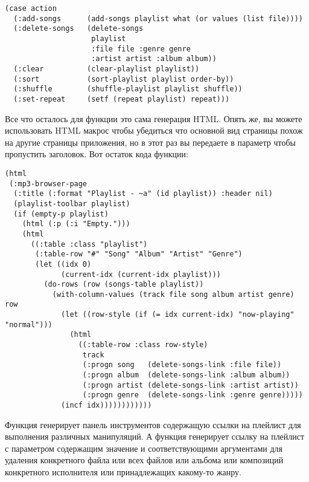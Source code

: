 \begin{lstlisting}
(case action
  (:add-songs      (add-songs playlist what (or values (list file))))
  (:delete-songs   (delete-songs 
                    playlist 
                    :file file :genre genre
                    :artist artist :album album))
  (:clear          (clear-playlist playlist))
  (:sort           (sort-playlist playlist order-by))
  (:shuffle        (shuffle-playlist playlist shuffle))
  (:set-repeat     (setf (repeat playlist) repeat)))
\end{lstlisting}

Все что осталось для функции  это сама генерация HTML. Опять же, вы можете
использовать HTML макрос  чтобы убедиться что основной вид
страницы похож на другие страницы приложения, но в этот раз вы передаете  в
параметр  чтобы пропустить  заголовок. Вот остаток кода функции:

\begin{lstlisting}
(html
 (:mp3-browser-page
  (:title (:format "Playlist - ~a" (id playlist)) :header nil)
  (playlist-toolbar playlist)
  (if (empty-p playlist)
    (html (:p (:i "Empty.")))
    (html 
      ((:table :class "playlist")
       (:table-row "#" "Song" "Album" "Artist" "Genre")
       (let ((idx 0)
             (current-idx (current-idx playlist)))
         (do-rows (row (songs-table playlist))
           (with-column-values (track file song album artist genre) row
             (let ((row-style (if (= idx current-idx) "now-playing" "normal")))
               (html
                 ((:table-row :class row-style)
                  track
                  (:progn song   (delete-songs-link :file file))
                  (:progn album  (delete-songs-link :album album))
                  (:progn artist (delete-songs-link :artist artist))
                  (:progn genre  (delete-songs-link :genre genre)))))
             (incf idx))))))))))))
\end{lstlisting}

Функция  генерирует панель инструментов содержащую ссылки на
плейлист для выполнения различных  манипуляций. А функция
 генерирует ссылку на плейлист с параметром 
содержащим значение  и соответствующими аргументами для удаления
конкретного файла или всех файлов или альбома или композиций конкретного исполнителя или
принадлежащих какому-то жанру.

